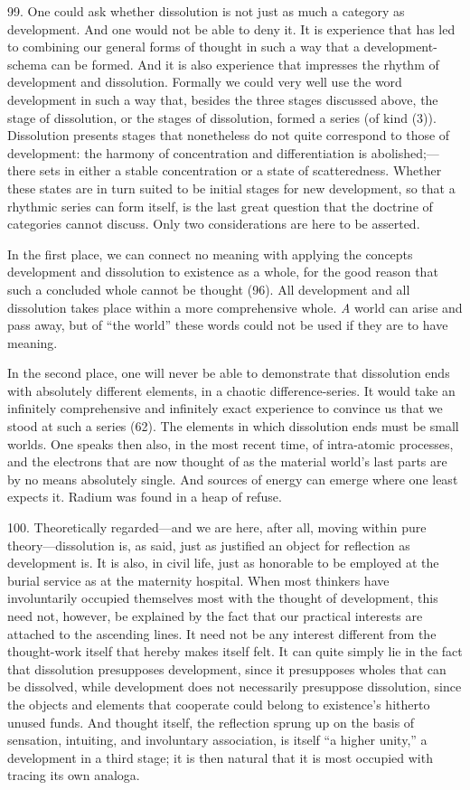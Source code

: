 \documentclass[12pt,a4paper]{book}
\newcommand{\opage}[1]{\marginnote{\footnotesize\textit{[#1]}}}
\begin{document}
99. One could ask whether dissolution is not just as much a category as
development. And one would not be able to deny it. It is experience that has
led to combining our general forms of thought in such a way that a
development-schema can be formed. And it is also experience that impresses the
rhythm of development and dissolution. Formally we could very well use the
word development in such a way that, besides the three stages discussed above,
the stage of dissolution, or the stages of dissolution, formed a series (of
kind (3)). Dissolution presents stages that nonetheless do not quite
correspond to those of development: the harmony of concentration and
differentiation is abolished;---there sets in either a stable concentration
or a state of scatteredness. Whether these states are in turn suited to be
initial stages for new development, so that a rhythmic series can form
itself, is the last great question that \opage{235}the doctrine of categories cannot
discuss. Only two considerations are here to be asserted.

In the first place, we can connect no meaning with applying the concepts
development and dissolution to existence as a whole, for the good reason that
such a concluded whole cannot be thought (96). All development and all
dissolution takes place within a more comprehensive whole. \emph{A} world can
arise and pass away, but of ``the world'' these words could not be used if
they are to have meaning.

In the second place, one will never be able to demonstrate that dissolution
ends with absolutely different elements, in a chaotic difference-series. It
would take an infinitely comprehensive and infinitely exact experience to
convince us that we stood at such a series (62). The elements in which
dissolution ends must be small worlds. One speaks then also, in the most
recent time, of intra-atomic processes, and the electrons that are now
thought of as the material world's last parts are by no means absolutely
single. And sources of energy can emerge where one least expects it. Radium
was found in a heap of refuse.

100. Theoretically regarded---and we are here, after all, moving within pure
theory---dissolution is, as said, just as justified an object for reflection
as development is. It is also, in civil life, just as honorable to be employed
at the burial service as at the maternity hospital. When most thinkers have
involuntarily occupied themselves most with the thought of development, this
need not, however, be explained by the fact that our practical interests are
attached to the ascending lines. It need not be any interest different from
the thought-work itself that hereby makes itself felt. It can quite simply lie
in the fact that dissolution presupposes development, since it presupposes
wholes that can be dissolved, while development does not necessarily
presuppose dissolution, since the objects and elements that cooperate could
belong to existence's hitherto unused funds. And thought itself, the
reflection sprung up on the basis of sensation, intuiting, and involuntary
\opage{236}association, is itself ``a higher unity,'' a development in a third stage; it
is then natural that it is most occupied with tracing its own analoga.
\end{document}
